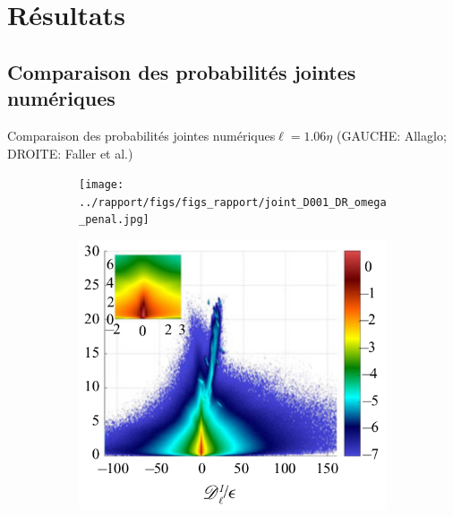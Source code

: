 \documentclass[aspectratio=169,usenames,dvipsnames]{beamer}
\begin{document}

\section{Résultats}
\subsection{Comparaison des probabilités jointes numériques}
\begin{frame}{Comparaison des probabilités jointes numériques}{$\ell=1.06\eta$ 
    (GAUCHE: Allaglo; DROITE: Faller et al.)}
\begin{figure}[H]
    \centering
    \begin{subfigure}[b]{0.48\linewidth}
    \centering
    \texttt{[image: ../rapport/figs/figs\_rapport/joint\_D001\_DR\_omega\_penal.jpg]}
    \end{subfigure}
    \begin{subfigure}[b]{0.4\linewidth}
      \centering
      \includegraphics[width=\textwidth]{figs/faller_l1_dns.png}
      \end{subfigure}
    \label{fig:DR_penal}
  \end{figure}
\end{frame}
\end{document}

